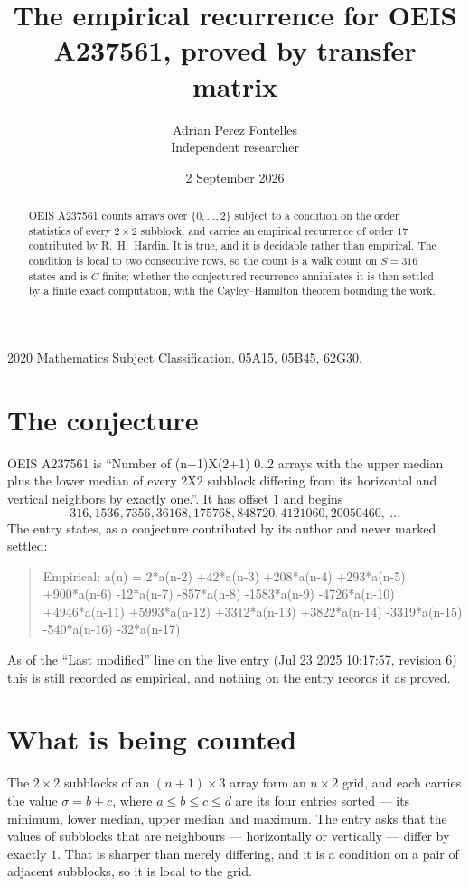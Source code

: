 \documentclass[11pt,a4paper]{article}
\title{The empirical recurrence for OEIS A237561, proved by transfer matrix}
\author{Adrian Perez Fontelles\\ \small Independent researcher}
\date{2 September 2026}
\theoremstyle{plain}
\theoremstyle{definition}
\begin{document}
\maketitle

\begin{abstract}
OEIS A237561 counts arrays over $\{0,\dots,2\}$ subject to a condition on the order
statistics of every $2\times2$ subblock, and carries an empirical recurrence of order
$17$ contributed by R.~H.~Hardin. It is true, and it is decidable rather than empirical.
The condition is local to two consecutive rows, so the count is a walk count on $S=316$
states and is $C$-finite; whether the conjectured recurrence annihilates it is then settled by
a finite exact computation, with the Cayley--Hamilton theorem bounding the work.
\end{abstract}

\noindent\small 2020 Mathematics Subject Classification. 05A15, 05B45, 62G30.\normalsize

\section{The conjecture}

OEIS A237561 is ``Number of (n+1)X(2+1) 0..2 arrays with the upper median plus the lower median of every 2X2 subblock differing from its horizontal and vertical neighbors by exactly one.''. It has offset $1$ and begins
\[
316, 1536, 7356, 36168, 175768, 848720, 4121060, 20050460,\ \dots
\]
The entry states, as a conjecture contributed by its author and never marked settled:
\begin{quote}
Empirical: a(n) = 2*a(n-2) +42*a(n-3) +208*a(n-4) +293*a(n-5) +900*a(n-6) -12*a(n-7) -857*a(n-8) -1583*a(n-9) -4726*a(n-10) +4946*a(n-11) +5993*a(n-12) +3312*a(n-13) +3822*a(n-14) -3319*a(n-15) -540*a(n-16) -32*a(n-17)
\end{quote}
As of the ``Last modified'' line on the live entry (Jul 23 2025 10:17:57, revision 6) this is still
recorded as empirical, and nothing on the entry records it as proved.

\section{What is being counted}

The $2\times2$ subblocks of an $(n+1)\times3$ array form an
$n\times2$ grid, and each carries the value $\sigma=b+c$, where $a\le b\le c\le d$ are its four entries sorted --- its minimum, lower median, upper median and maximum. The entry asks that the values of
subblocks that are neighbours --- horizontally or vertically --- differ by exactly $1$.
That is sharper than merely differing, and it is a condition on a pair of adjacent subblocks,
so it is local to the grid.
\end{document}
